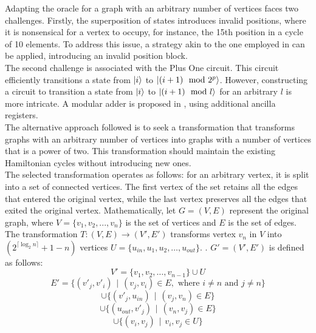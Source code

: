 \documentclass[10pt,a4paper]{article}
\begin{document}
Adapting the oracle for a graph with an arbitrary number of vertices faces two challenges. Firstly, the superposition of states introduces invalid positions, where it is nonsensical for a vertex to occupy, for instance, the 15th position in a cycle of 10 elements. To address this issue, a strategy akin to the one employed in \cite{Coloring1} can be applied, introducing an invalid position block.\\
The second challenge is associated with the Plus One circuit. This circuit efficiently transitions a state from $\ket{i}$ to $\ket{(i + 1) \mod 2^p}$. However, constructing a circuit to transition a state from $\ket{i}$ to $\ket{(i + 1) \mod l}$ for an arbitrary $l$ is more intricate. A modular adder is proposed in \cite{modular}, using additional ancilla registers.\\
The alternative approach followed is to seek a transformation that transforms graphs with an arbitrary number of vertices into graphs with a number of vertices that is a power of two. This transformation should maintain the existing Hamiltonian cycles without introducing new ones.\\
The selected transformation operates as follows: for an arbitrary vertex, it is split into a set of connected vertices. The first vertex of the set retains all the edges that entered the original vertex, while the last vertex preserves all the edges that exited the original vertex. Mathematically, let $G = (V, E)$ represent the original graph, where $V = \{v_1, v_2, ..., v_n\}$ is the set of vertices and $E$ is the set of edges. The transformation $T : (V, E) \rightarrow (V\prime, E\prime)$ transforms vertex $v_n$ in $V$ into $(2^{\lceil \log_2{n} \rceil} + 1 -n)$ vertices $U = \{u_{in}, u_{1}, u_{2}, \dots, u_{out}\}$. . $G\prime = (V\prime, E\prime)$ is defined as follows:
$$V' = \{v_1, v_2, \dots, v_{n-1}\} \cup U$$
$$ E' = \{(v'_j, v'_i) \hspace{5pt} | \hspace{5pt} (v_j, v_i) \in E, \text{ where } i \neq n \text{ and } j \neq n\} $$
$$\cup \{(v'_j, u_{in}) \hspace{5pt} | \hspace{5pt} (v_j, v_n) \in E\} $$
$$\cup \{(u_{out}, v'_j) \hspace{5pt}|\hspace{5pt} (v_n, v_j) \in E\} $$
$$\cup \{(v_i, v_j) \hspace{5pt} | \hspace{5pt} v_i, v_j \in U\}$$
\end{document}
